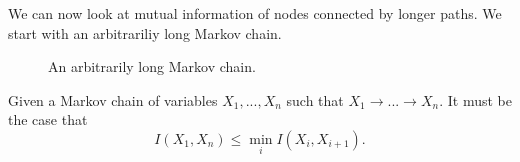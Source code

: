 \documentclass[../thesis.tex]{subfiles}
\begin{document}
We can now look at mutual information of nodes connected
by longer paths.
We start with an arbitrariliy long Markov chain.

\begin{figure}
\begin{center}
\end{center}
\caption{An arbitrarily long Markov chain.}
\end{figure}

\begin{thm}
  \label{cdpi-thm}
  Given a Markov chain of variables $X_1, ..., X_n$
  such that $X_1 \rightarrow ... \rightarrow X_n$.
  It must be the case that
  $$I(X_1,X_n) \leq \min_i I(X_i,X_{i+1}).$$
\end{thm}
\end{document}
